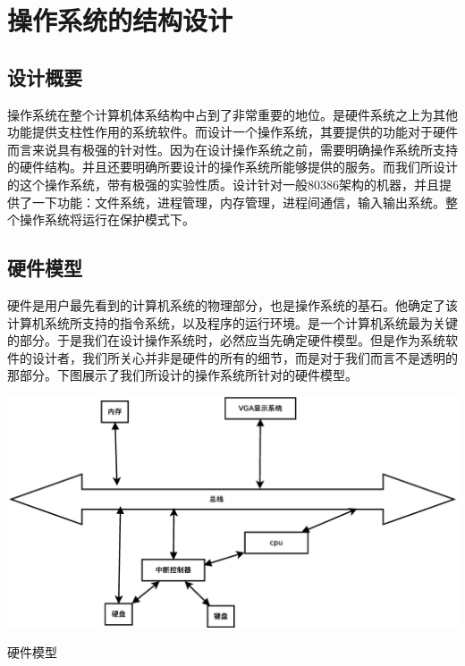 \documentclass[UTF8,nofonts]{ctexrep}
\begin{document}

\CTEXoptions[contentsname={\zihao{3}目\ 录}]
\tableofcontents

\CTEXoptions[abstractname={\zihao{3}摘要}]
\begin{abstract}

\end{abstract}

\CTEXoptions[abstractname={\zihao{3}ABSTRACT}]
\begin{abstract}
\end{abstract}

\CTEXoptions[abstractname={\zihao{3}前言}]
\begin{abstract}

\end{abstract}

\chapter{操作系统的结构设计}
\section{设计概要}
操作系统在整个计算机体系结构中占到了非常重要的地位。是硬件系统之上为其他功能提供支柱性作用的系统软件。而设计一个操作系统，其要提供的功能对于硬件而言来说具有极强的针对性。因为在设计操作系统之前，需要明确操作系统所支持的硬件结构。并且还要明确所要设计的操作系统所能够提供的服务。而我们所设计的这个操作系统，带有极强的实验性质。设计针对一般80386架构的机器，并且提供了一下功能：文件系统，进程管理，内存管理，进程间通信，输入输出系统。整个操作系统将运行在保护模式下。
\section{硬件模型}
硬件是用户最先看到的计算机系统的物理部分，也是操作系统的基石。他确定了该计算机系统所支持的指令系统，以及程序的运行环境。是一个计算机系统最为关键的部分。于是我们在设计操作系统时，必然应当先确定硬件模型。但是作为系统软件的设计者，我们所关心并非是硬件的所有的细节，而是对于我们而言不是透明的那部分。下图展示了我们所设计的操作系统所针对的硬件模型。
\begin{center}
\label{硬件模型}
\includegraphics[scale=0.4]{sumti.eps}
\caption{硬件模型}
\end{center}
\end{document}
